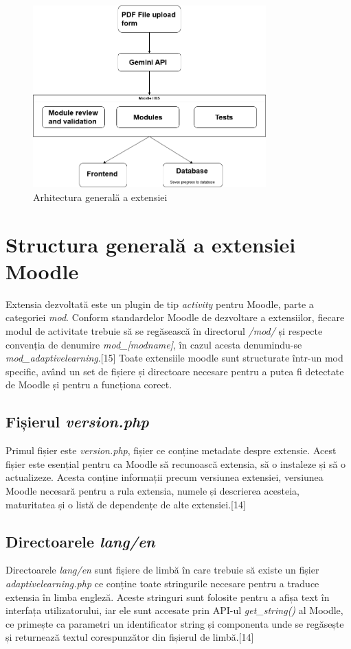 \begin{figure}[ht]
    \centering
    \includegraphics[width=0.8\textwidth]{images/LicentaArchitectureDiagram.png}
    \caption{Arhitectura generală a extensiei}
    \label{fig:arch_diagram}
\end{figure}

\section{Structura generală a extensiei Moodle}

Extensia dezvoltată este un plugin de tip \textit{activity} pentru Moodle, parte a categoriei \textit{mod}. Conform standardelor Moodle de dezvoltare a extensiilor, fiecare modul de activitate 
trebuie să se regăsească în directorul \textit{/mod/} și respecte convenția de denumire \textit{mod\_[modname]}, în cazul acesta denumindu-se \textit{mod\_adaptivelearning}.[15] Toate extensiile 
moodle sunt structurate într-un mod specific, având un set de fișiere și directoare necesare pentru a putea fi detectate de Moodle și pentru a funcționa corect. 

\subsection{Fișierul \textit{version.php}}
Primul fișier este 
\textit{version.php}, fișier ce conține metadate despre extensie. Acest fișier este esențial pentru ca Moodle să recunoască extensia, să o instaleze și să o actualizeze. Acesta conține 
informații precum versiunea extensiei, versiunea Moodle necesară pentru a rula extensia, numele și descrierea acesteia, maturitatea și o listă de dependențe de alte extensiei.[14] 

\subsection{Directoarele \textit{lang/en}}
Directoarele 
\textit{lang/en} sunt fișiere de limbă în care trebuie să existe un fișier \textit{adaptivelearning.php} ce conține toate stringurile necesare pentru a traduce extensia în limba engleză. 
Aceste stringuri sunt folosite pentru a afișa text în interfața utilizatorului, iar ele sunt accesate prin API-ul \textit{get\_string()} al Moodle, ce primește ca parametri un identificator
string și componenta unde se regăsește și returnează textul corespunzător din fișierul de limbă.[14]

